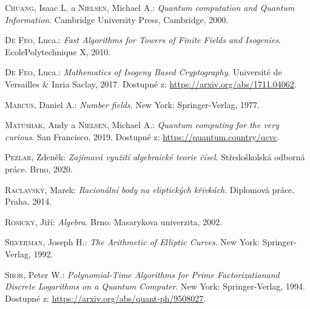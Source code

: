 \documentclass [12pt]{report}
\begin{document}



\begin{thebibliography}{97}

\textsc{Chuang}, Isaac L. a \textsc{Nielsen}, Michael A.: \textit{Quantum computation and Quantum Information}. Cambridge University Press, Cambridge, 2000. 


\textsc{De Feo}, Luca.: \textit{Fast Algorithms for Towers of Finite Fields and Isogenies}. EcolePolytechnique X, 2010. 

\textsc{De Feo}, Luca.: \textit{Mathematics of Isogeny Based Cryptography}. Université de Versailles \& Inria Saclay, 2017. Dostupné z: \url{https://arxiv.org/abs/1711.04062}.

\textsc{Marcus}, Daniel A.: \textit{Number fields}. New York: Springer-Verlag, 1977.

\textsc{Matushak}, Andy a \textsc{Nielsen}, Michael A.: \textit{ Quantum computing for the very curious}. San Francisco, 2019. Dostupné z: \url{https://quantum.country/qcvc}.

\textsc{Pezlar}, Zdeněk: \textit{Zajímavá využití algebraické teorie čísel}. Středoškolská odborná práce. Brno, 2020.

\textsc{Raclavský}, Marek: \textit{Racionální body na eliptických křivkách}. Diplomová práce. Praha, 2014.

\textsc{Rosický}, Jiří: \textit{Algebra}. Brno: Masarykova univerzita, 2002.

\textsc{Silverman}, Joseph H.: \textit{The Arithmetic of Elliptic Curves}. New York: Springer-Verlag, 1992. 


\textsc{Shor}, Peter W.: \textit{Polynomial-Time Algorithms for Prime Factorizationand Discrete Logarithms on a Quantum Computer}. New York: Springer-Verlag, 1994. Dostupné z: \url{https://arxiv.org/abs/quant-ph/9508027}.


\end{thebibliography}
\end{document}
